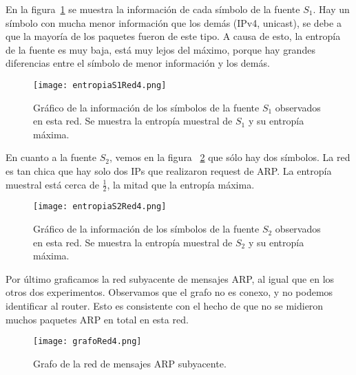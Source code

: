 En la figura~\ref{entropias1_4} se muestra la información de cada símbolo de la fuente $S_1$. Hay un símbolo con mucha menor información que los demás (IPv4, unicast), se debe a que la mayoría de los paquetes fueron de este tipo. A causa de esto, la entropía de la fuente es muy baja, está muy lejos del máximo, porque hay grandes diferencias entre el símbolo de menor información y los demás.

\begin{figure}[H]
\centering
\texttt{[image: entropiaS1Red4.png]}
\caption{Gráfico de la información de los símbolos de la fuente $S_1$ observados en esta red. Se muestra la entropía muestral de $S_1$ y su entropía máxima.}
\label{entropias1_4}
\end{figure}

En cuanto a la fuente $S_2$, vemos en la figura ~\ref{entropias2_4} que sólo hay dos símbolos. La red es tan chica que hay solo dos IPs que realizaron request de ARP. La entropía muestral está cerca de $\frac{1}{2}$, la mitad que la entropía máxima.

\begin{figure}[H]
\centering
\texttt{[image: entropiaS2Red4.png]}
\caption{Gráfico de la información de los símbolos de la fuente $S_2$ observados en esta red. Se muestra la entropía muestral de $S_2$ y su entropía máxima.}
\label{entropias2_4}
\end{figure}

Por último graficamos la red subyacente de mensajes ARP, al igual que en los otros dos experimentos. Observamos que el grafo no es conexo, y no podemos identificar al router. Esto es consistente con el hecho de que no se midieron muchos paquetes ARP en total en esta red.

\begin{figure}[H]
\centering
\texttt{[image: grafoRed4.png]}
\caption{Grafo de la red de mensajes ARP subyacente.}
\label{grafo4}
\end{figure}
